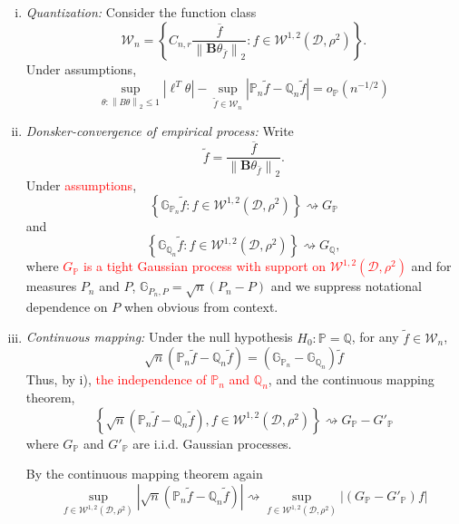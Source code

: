 \documentclass{article}
\newcommand{\norm}[1]{\left\lVert#1\right\rVert}
\newcommand{\abs}[1]{\left \lvert #1 \right \rvert}
\newcommand{\set}[1]{\left\{#1\right\}}
\newcommand{\Bbf}{\mathbf{B}}
\newcommand{\lbf}{\bm{\ell}}
\newcommand{\Dset}{\mathcal{D}}
\newcommand{\Wset}{\mathcal{W}}
\newcommand{\Pbb}{\mathbb{P}}
\newcommand{\Qbb}{\mathbb{Q}}
\newcommand{\Gbb}{\mathbb{G}}
\newcommand{\1}{\mathbf{1}}
\theoremstyle{alden}
\theoremstyle{aldenthm}
\theoremstyle{remark}
\begin{document}
\begin{enumerate}[(i)]
	\item \emph{Quantization:} Consider the function class
	\begin{equation}
	\label{eqn: quantized_function_class}
	\Wset_n = \set{C_{n,r}\frac{\overline{f}}{\norm{\Bbf \theta_{\bar{f}}}_2}: f \in \Wset^{1,2}(\Dset,\rho^2)}.
	\end{equation}
	Under assumptions,
	\begin{equation*}
	\sup_{\theta: \norm{B\theta}_2 \leq 1} \abs{\lbf^T \theta} - \sup_{\widetilde{f} \in \Wset_n} \abs{\Pbb_n \widetilde{f} - \Qbb_n \widetilde{f}} = o_{\Pbb}(n^{-1/2})
	\end{equation*}
	\item \emph{Donsker-convergence of empirical process:} Write 
	\begin{equation*}
	\widetilde{f} = \frac{\overline{f}}{\norm{\Bbf \theta_{\bar{f}}}_2}.
	\end{equation*}
	Under \textcolor{red}{assumptions},
	\begin{equation*}
	\set{\Gbb_{\Pbb_n}\widetilde{f}: f \in \Wset^{1,2}(\Dset,\rho^2)} \rightsquigarrow G_{\Pbb}
	\end{equation*}
	and 
	\begin{equation*}
	\set{\Gbb_{\Qbb_n}\widetilde{f}: f \in \Wset^{1,2}(\Dset,\rho^2)} \rightsquigarrow G_{\Qbb},
	\end{equation*}
	where \textcolor{red}{$G_{\Pbb}$ is a tight Gaussian process with support on $\Wset^{1,2}(\Dset,\rho^2)$} and for measures $P_n$ and $P$, $\Gbb_{P_n,P} = \sqrt{n}(P_n - P)$ and we suppress notational dependence on $P$ when obvious from context.
	\item \emph{Continuous mapping:}
	Under the null hypothesis $H_0: \Pbb = \Qbb$, for any $\widetilde{f} \in \Wset_n$, 
	\begin{equation*}
	\sqrt{n}(\Pbb_n \widetilde{f} - \Qbb_n \widetilde{f}) = (\Gbb_{\Pbb_n} - \Gbb_{\Qbb_n})\widetilde{f}
	\end{equation*}
	Thus, by i), \textcolor{red}{the independence of $\Pbb_n$ and $\Qbb_n$}, and the continuous mapping theorem,
	\begin{equation*}
	\set{\sqrt{n}(\Pbb_n \widetilde{f} - \Qbb_n \widetilde{f}), f \in \Wset^{1,2}(\Dset,\rho^2)} \rightsquigarrow G_{\Pbb} - G'_{\Pbb}
	\end{equation*}
	where $G_{\Pbb}$ and $G'_{\Pbb}$ are i.i.d. Gaussian processes.
	
	By the continuous mapping theorem again
	\begin{equation*}
	\sup_{f \in \Wset^{1,2}(\Dset,\rho^2)} \abs{\sqrt{n}(\Pbb_n \widetilde{f} - \Qbb_n \widetilde{f}) } \rightsquigarrow \sup_{f \in \Wset^{1,2}(\Dset,\rho^2)} \abs{(G_{\Pbb} - G'_{\Pbb})f}
	\end{equation*}
\end{enumerate}
\end{document}
